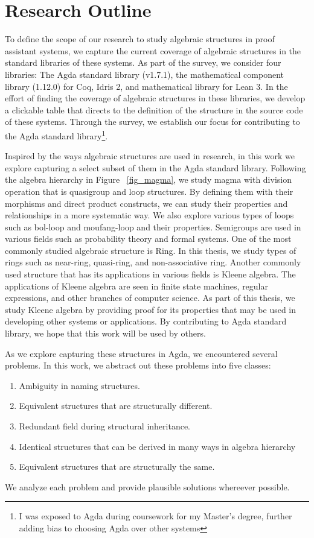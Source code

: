\section{Research Outline}
To define the scope of our research to study algebraic structures in proof
assistant systems, we capture the current coverage of algebraic structures in
the standard libraries of these systems. As part of the survey, we consider four
libraries: The Agda standard library (v1.7.1), the mathematical component
library (1.12.0) for Coq, Idris 2, and mathematical library for Lean 3. In
the effort of finding the coverage of algebraic structures in these libraries, we
develop a clickable table that directs to the definition of the structure in the
source code of these systems. Through the survey, we establish our focus for
contributing to the Agda standard library\footnote{I was exposed to Agda during
coursework for my Master's degree, further adding bias to choosing Agda over
other systems}.

Inspired by the ways algebraic structures are used in research, in this work we
explore capturing a select subset of them in the Agda standard library.
Following the algebra hierarchy in Figure ~\ref{fig_magma}, we study magma with
division operation that is quasigroup and loop structures. By defining them with
their morphisms and direct product constructs, we can study their properties and
relationships in a more systematic way. We also explore various types of loops
such as bol-loop and moufang-loop and their properties. Semigroups are used in
various fields such as probability theory and formal systems. One of the most
commonly studied algebraic structure is Ring. In this thesis, we study types of
rings such as near-ring, quasi-ring, and non-associative ring. Another commonly
used structure that has its applications in various fields is Kleene algebra.
The applications of Kleene algebra are seen in finite state machines, regular
expressions, and other branches of computer science. As part of this thesis, we
study Kleene algebra by providing proof for its properties that may be used in
developing other systems or applications. By contributing to Agda standard
library, we hope that this work will be used by others. 

As we explore capturing these structures in Agda, we encountered several
problems. In this work, we abstract out these problems into five classes:
\begin{enumerate}
\item Ambiguity in naming structures.
\item Equivalent structures that are structurally different.
\item Redundant field during structural inheritance.
\item Identical structures that can be derived in many ways in algebra hierarchy
\item Equivalent structures that are structurally the same.
\end{enumerate}
We analyze each problem and provide plausible solutions whereever possible.

